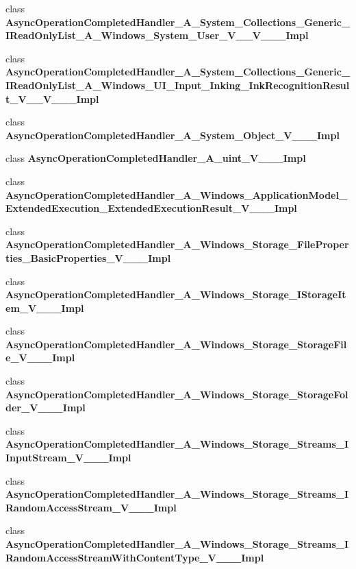 \begin{DoxyCompactItemize}
class {\bfseries Async\+Operation\+Completed\+Handler\+\_\+\+A\+\_\+\+System\+\_\+\+Collections\+\_\+\+Generic\+\_\+\+I\+Read\+Only\+List\+\_\+\+A\+\_\+\+Windows\+\_\+\+System\+\_\+\+User\+\_\+\+V\+\_\+\+\_\+\+V\+\_\+\+\_\+\+\_\+\+Impl}
\item 
class {\bfseries Async\+Operation\+Completed\+Handler\+\_\+\+A\+\_\+\+System\+\_\+\+Collections\+\_\+\+Generic\+\_\+\+I\+Read\+Only\+List\+\_\+\+A\+\_\+\+Windows\+\_\+\+U\+I\+\_\+\+Input\+\_\+\+Inking\+\_\+\+Ink\+Recognition\+Result\+\_\+\+V\+\_\+\+\_\+\+V\+\_\+\+\_\+\+\_\+\+Impl}
\item 
class {\bfseries Async\+Operation\+Completed\+Handler\+\_\+\+A\+\_\+\+System\+\_\+\+Object\+\_\+\+V\+\_\+\+\_\+\+\_\+\+Impl}
\item 
class {\bfseries Async\+Operation\+Completed\+Handler\+\_\+\+A\+\_\+uint\+\_\+\+V\+\_\+\+\_\+\+\_\+\+Impl}
\item 
class {\bfseries Async\+Operation\+Completed\+Handler\+\_\+\+A\+\_\+\+Windows\+\_\+\+Application\+Model\+\_\+\+Extended\+Execution\+\_\+\+Extended\+Execution\+Result\+\_\+\+V\+\_\+\+\_\+\+\_\+\+Impl}
\item 
class {\bfseries Async\+Operation\+Completed\+Handler\+\_\+\+A\+\_\+\+Windows\+\_\+\+Storage\+\_\+\+File\+Properties\+\_\+\+Basic\+Properties\+\_\+\+V\+\_\+\+\_\+\+\_\+\+Impl}
\item 
class {\bfseries Async\+Operation\+Completed\+Handler\+\_\+\+A\+\_\+\+Windows\+\_\+\+Storage\+\_\+\+I\+Storage\+Item\+\_\+\+V\+\_\+\+\_\+\+\_\+\+Impl}
\item 
class {\bfseries Async\+Operation\+Completed\+Handler\+\_\+\+A\+\_\+\+Windows\+\_\+\+Storage\+\_\+\+Storage\+File\+\_\+\+V\+\_\+\+\_\+\+\_\+\+Impl}
\item 
class {\bfseries Async\+Operation\+Completed\+Handler\+\_\+\+A\+\_\+\+Windows\+\_\+\+Storage\+\_\+\+Storage\+Folder\+\_\+\+V\+\_\+\+\_\+\+\_\+\+Impl}
\item 
class {\bfseries Async\+Operation\+Completed\+Handler\+\_\+\+A\+\_\+\+Windows\+\_\+\+Storage\+\_\+\+Streams\+\_\+\+I\+Input\+Stream\+\_\+\+V\+\_\+\+\_\+\+\_\+\+Impl}
\item 
class {\bfseries Async\+Operation\+Completed\+Handler\+\_\+\+A\+\_\+\+Windows\+\_\+\+Storage\+\_\+\+Streams\+\_\+\+I\+Random\+Access\+Stream\+\_\+\+V\+\_\+\+\_\+\+\_\+\+Impl}
\item 
class {\bfseries Async\+Operation\+Completed\+Handler\+\_\+\+A\+\_\+\+Windows\+\_\+\+Storage\+\_\+\+Streams\+\_\+\+I\+Random\+Access\+Stream\+With\+Content\+Type\+\_\+\+V\+\_\+\+\_\+\+\_\+\+Impl}

\end{DoxyCompactItemize}

